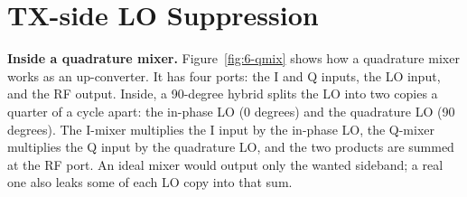 \clearpage
\section{TX-side LO Suppression}
\label{sec:lo-suppression}


\textbf{Inside a quadrature mixer.} Figure~\ref{fig:6-qmix} shows how a quadrature mixer works as an up-converter.
It has four ports: the I and Q inputs, the LO input, and the RF output. Inside, a 90-degree hybrid splits the LO into
two copies a quarter of a cycle apart: the in-phase LO (0 degrees) and the quadrature LO (90 degrees). The I-mixer
multiplies the I input by the in-phase LO, the Q-mixer multiplies the Q input by the quadrature LO, and the two products
are summed at the RF port. An ideal mixer would output only the wanted sideband; a real one also leaks some of each LO
copy into that sum.

